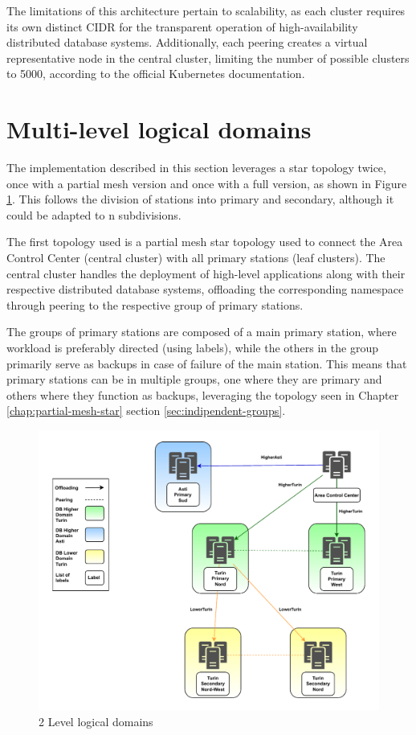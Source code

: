 The limitations of this architecture pertain to scalability, as each cluster requires its own distinct CIDR for the transparent operation of high-availability distributed database systems. Additionally, each peering creates a virtual representative node in the central cluster, limiting the number of possible clusters to 5000, according to the official Kubernetes documentation.

\section{Multi-level logical domains}
The implementation described in this section leverages a star topology twice, once with a partial mesh version and once with a full version, as shown in Figure \ref{fig:level-imp}. This follows the division of stations into primary and secondary, although it could be adapted to n subdivisions.

The first topology used is a partial mesh star topology used to connect the Area Control Center (central cluster) with all primary stations (leaf clusters). The central cluster handles the deployment of high-level applications along with their respective distributed database systems, offloading the corresponding namespace through peering to the respective group of primary stations.

The groups of primary stations are composed of a main primary station, where workload is preferably directed (using labels), while the others in the group primarily serve as backups in case of failure of the main station. This means that primary stations can be in multiple groups, one where they are primary and others where they function as backups, leveraging the topology seen in Chapter \ref{chap:partial-mesh-star} section \ref{sec:indipendent-groups}.

\begin{figure}[ht]\centering
\includegraphics[scale=0.7]{Pictures/2level}
\caption{2 Level logical domains }\label{fig:level-imp}
\end{figure}


